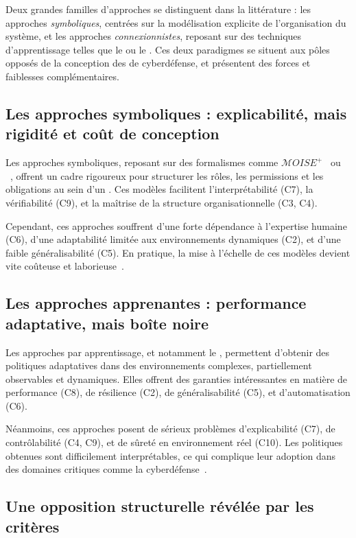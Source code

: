 Deux grandes familles d'approches se distinguent dans la littérature : les approches \textit{symboliques}, centrées sur la modélisation explicite de l'organisation du système, et les approches \textit{connexionnistes}, reposant sur des techniques d'apprentissage telles que le  ou le . Ces deux paradigmes se situent aux pôles opposés de la conception des  de cyberdéfense, et présentent des forces et faiblesses complémentaires.

\subsection{Les approches symboliques : explicabilité, mais rigidité et coût de conception}

Les approches symboliques, reposant sur des formalismes comme $\mathcal{M}OISE^+$~\cite{hubner2002moise} ou ~\cite{Ferber2004}, offrent un cadre rigoureux pour structurer les rôles, les permissions et les obligations au sein d'un . Ces modèles facilitent l'interprétabilité (C7), la vérifiabilité (C9), et la maîtrise de la structure organisationnelle (C3, C4).

Cependant, ces approches souffrent d'une forte dépendance à l'expertise humaine (C6), d'une adaptabilité limitée aux environnements dynamiques (C2), et d'une faible généralisabilité (C5). En pratique, la mise à l'échelle de ces modèles devient vite coûteuse et laborieuse~\cite{Picard2006}.

\subsection{Les approches apprenantes : performance adaptative, mais boîte noire}

Les approches par apprentissage, et notamment le , permettent d'obtenir des politiques adaptatives dans des environnements complexes, partiellement observables et dynamiques. Elles offrent des garanties intéressantes en matière de performance (C8), de résilience (C2), de généralisabilité (C5), et d'automatisation (C6).

Néanmoins, ces approches posent de sérieux problèmes d'explicabilité (C7), de contrôlabilité (C4, C9), et de sûreté en environnement réel (C10). Les politiques obtenues sont difficilement interprétables, ce qui complique leur adoption dans des domaines critiques comme la cyberdéfense~\cite{Gunning2019}.

\subsection{Une opposition structurelle révélée par les critères}

